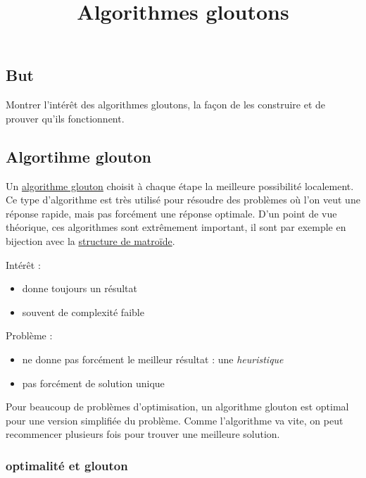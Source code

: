 \documentclass[
]{article}
\title{Algorithmes gloutons}
\author{}
\date{}
\providecommand{\tightlist}{%
  \setlength{\itemsep}{0pt}\setlength{\parskip}{0pt}}
\begin{document}
\maketitle

\hypertarget{but}{%
\subsection{But}\label{but}}

Montrer l'intérêt des algorithmes gloutons, la façon de les construire
et de prouver qu'ils fonctionnent.

\hypertarget{algortihme-glouton}{%
\subsection{Algortihme glouton}\label{algortihme-glouton}}

Un \href{https://fr.wikipedia.org/wiki/Algorithme_glouton}{algorithme
glouton} choisit à chaque étape la meilleure possibilité localement. Ce
type d'algorithme est très utilisé pour résoudre des problèmes où l'on
veut une réponse rapide, mais pas forcément une réponse optimale. D'un
point de vue théorique, ces algorithmes sont extrêmement important, il
sont par exemple en bijection avec la
\href{https://fr.wikipedia.org/wiki/Matro\%C3\%AFde}{structure de
matroïde}.

Intérêt :

\begin{itemize}
\tightlist
\item
  donne toujours un résultat
\item
  souvent de complexité faible
\end{itemize}

Problème :

\begin{itemize}
\tightlist
\item
  ne donne pas forcément le meilleur résultat : une \emph{heuristique}
\item
  pas forcément de solution unique
\end{itemize}

Pour beaucoup de problèmes d'optimisation, un algorithme glouton est
optimal pour une version simplifiée du problème. Comme l'algorithme va
vite, on peut recommencer plusieurs fois pour trouver une meilleure
solution.


\hypertarget{optimalituxe9-et-glouton}{%
\subsubsection{optimalité et glouton}\label{optimalituxe9-et-glouton}}
\end{document}
